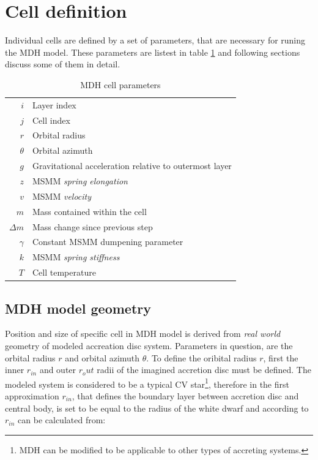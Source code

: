 \section{Cell definition}
Individual cells are defined by a set of parameters, that are necessary for runing the  MDH model. These parameters are listest in table \ref{table:mdh_cell_parameters} and following sections discuss some of them in detail.

\vspace{5mm}

\begin{table}[h]
\begin{center}
\begin{tabular}{r|l}
$i$			& Layer index \\
$j$			& Cell index \\
$r$			& Orbital radius \\
$\theta$		& Orbital azimuth \\ 
$g$			& Gravitational acceleration relative to outermost layer \\
$z$			& MSMM \emph{spring elongation}  \\
$v$			& MSMM \emph{velocity} \\
$m$			& Mass contained within the cell \\
$\Delta m$ 	& Mass change since previous step \\
$\gamma$		& Constant MSMM dumpening parameter \\
$k$			& MSMM \emph{spring stiffness} \\
$T$			& Cell temperature
\end{tabular}
\caption{MDH cell parameters}
\label{table:mdh_cell_parameters}
\end{center}
\end{table}

\subsection{MDH model geometry}
Position and size of specific cell in MDH model is derived from \emph{real world} geometry of modeled accreation disc system. Parameters in question, are the orbital radius $r$ and orbital azimuth $\theta$. To define the oribital radius $r$, first the inner $r_{in}$ and outer $r_out$ radii of the imagined accretion disc must be defined. The modeled system is considered to be a typical CV star\footnote{MDH can be modified to be applicable to other types of accreting systems.}, therefore in the first approximation $r_{in}$, that defines the boundary layer between accretion disc and central body, is set to be equal to the radius of the white dwarf and according to \cite{shapiro1983} $r_{in}$ can be calculated from:

